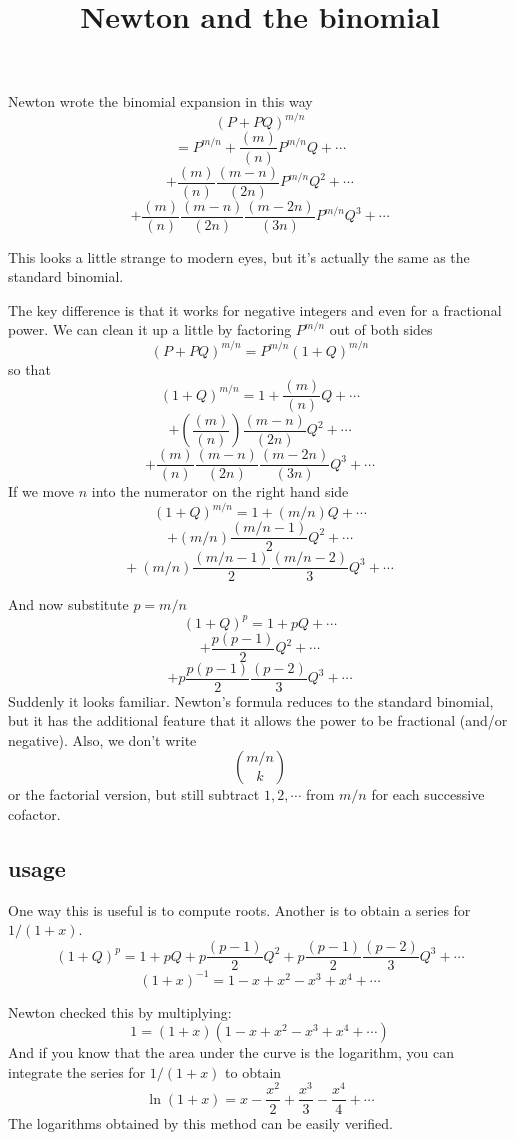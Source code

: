 \documentclass[11pt, oneside]{article}
\title{Newton and the binomial}
\date{}
\begin{document}
\maketitle
\Large

Newton wrote the binomial expansion in this way
\[ (P + PQ)^{m/n} \]
\[ = P^{m/n} + \frac{(m)}{(n)}P^{m/n}Q + \cdots \]
\[ + \frac{(m)}{(n)}\frac{(m-n)}{(2n)}P^{m/n}Q^2 + \cdots \]
\[ + \frac{(m)}{(n)}\frac{(m-n)}{(2n)}\frac{(m-2n)}{(3n)}P^{m/n}Q^3 + \cdots \] 

This looks a little strange to modern eyes, but it's actually the same as the standard binomial.

The key difference is that it works for negative integers and even for a fractional power.  We can clean it up a little by factoring $P^{m/n}$ out of both sides
\[ (P + PQ)^{m/n} = P^{m/n}(1 + Q)^{m/n} \]
so that
\[ (1 + Q)^{m/n} = 1 + \frac{(m)}{(n)}Q + \cdots \]
\[ + (\frac{(m)}{(n)}) \frac{(m-n)}{(2n)}Q^2 + \cdots \]
\[  + \frac{(m)}{(n)}\frac{(m-n)}{(2n)}\frac{(m-2n)}{(3n)}Q^3 + \cdots \]
If we move $n$ into the numerator on the right hand side
\[ (1 + Q)^{m/n} = 1 + (m/n)Q + \cdots \]
\[ + (m/n)\frac{(m/n-1)}{2}Q^2 + \cdots \]
\[ + \ (m/n)\frac{(m/n-1)}{2}\frac{(m/n-2)}{3}Q^3 + \cdots \]

And now substitute $p = m/n$
\[ (1 + Q)^p = 1 + pQ + \cdots \]
\[ + \frac{p(p-1)}{2}Q^2 + \cdots \]
\[ +  p\frac{p(p-1)}{2}\frac{(p-2)}{3}Q^3 + \cdots \]
Suddenly it looks familiar.  Newton's formula reduces to the standard binomial, but it has the additional feature that it allows the power to be fractional (and/or negative).  Also, we don't write 
\[ {m/n}\choose{k} \]
or the factorial version, but still subtract $1,2,\cdots$ from $m/n$ for each successive cofactor.

\subsection*{usage}
One way this is useful is to compute roots.  Another is to obtain a series for $1/(1+x)$.
\[ (1 + Q)^p = 1 + pQ + p\frac{(p-1)}{2}Q^2 + p\frac{(p-1)}{2}\frac{(p-2)}{3}Q^3 + \cdots \]
\[ (1+x)^{-1} = 1 - x + x^2 - x^3 + x^4 + \cdots  \]

Newton checked this by multiplying:
\[ 1 = (1+x)(1 - x + x^2 - x^3 + x^4 + \cdots)  \]
And if you know that the area under the curve is the logarithm, you can integrate the series for $1/(1+x)$ to obtain
\[ \ln(1+x) = x - \frac{x^2}{2} + \frac{x^3}{3} - \frac{x^4}{4} + \cdots \]
The logarithms obtained by this method can be easily verified.
\end{document}
